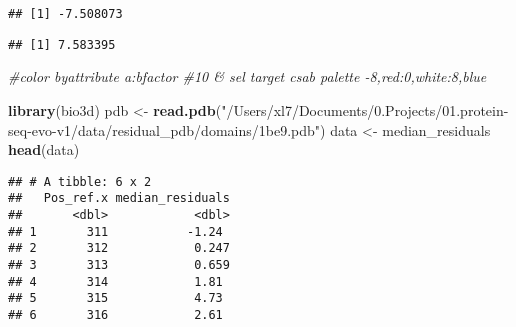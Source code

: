 \documentclass[
]{article}
\newenvironment{Shaded}{\begin{snugshade}}{\end{snugshade}}
\newcommand{\AttributeTok}[1]{\textcolor[rgb]{0.13,0.29,0.53}{#1}}
\newcommand{\CommentTok}[1]{\textcolor[rgb]{0.56,0.35,0.01}{\textit{#1}}}
\newcommand{\ConstantTok}[1]{\textcolor[rgb]{0.56,0.35,0.01}{#1}}
\newcommand{\FunctionTok}[1]{\textcolor[rgb]{0.13,0.29,0.53}{\textbf{#1}}}
\newcommand{\NormalTok}[1]{#1}
\newcommand{\OtherTok}[1]{\textcolor[rgb]{0.56,0.35,0.01}{#1}}
\newcommand{\SpecialCharTok}[1]{\textcolor[rgb]{0.81,0.36,0.00}{\textbf{#1}}}
\newcommand{\StringTok}[1]{\textcolor[rgb]{0.31,0.60,0.02}{#1}}
\begin{document}
\begin{Shaded}
\end{Shaded}

\begin{verbatim}
## [1] -7.508073
\end{verbatim}

\begin{Shaded}
\end{Shaded}

\begin{verbatim}
## [1] 7.583395
\end{verbatim}

\begin{Shaded}
\begin{Highlighting}[]
\CommentTok{\#color byattribute a:bfactor \#10 \& sel target csab palette {-}8,red:0,white:8,blue}

\FunctionTok{library}\NormalTok{(bio3d)}
\NormalTok{pdb }\OtherTok{\textless{}{-}} \FunctionTok{read.pdb}\NormalTok{(}\StringTok{"/Users/xl7/Documents/0.Projects/01.protein{-}seq{-}evo{-}v1/data/residual\_pdb/domains/1be9.pdb"}\NormalTok{)}
\NormalTok{data }\OtherTok{\textless{}{-}}\NormalTok{ median\_residuals}
\FunctionTok{head}\NormalTok{(data)}
\end{Highlighting}
\end{Shaded}

\begin{verbatim}
## # A tibble: 6 x 2
##   Pos_ref.x median_residuals
##       <dbl>            <dbl>
## 1       311           -1.24 
## 2       312            0.247
## 3       313            0.659
## 4       314            1.81 
## 5       315            4.73 
## 6       316            2.61
\end{verbatim}
\end{document}
